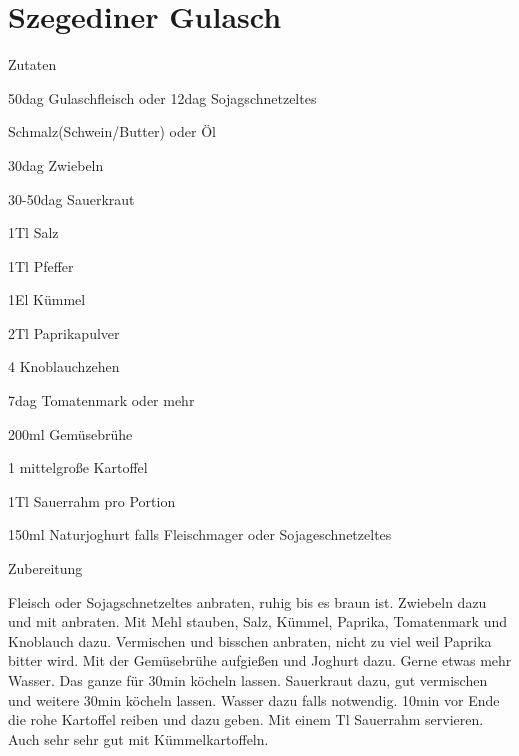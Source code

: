 \chapter*{Szegediner Gulasch}
\begin{multicols}{2}
 {\Large Zutaten}
 \begin{Zutaten}
		\item 50dag Gulaschfleisch
		oder 12dag Sojagschnetzeltes
		\item Schmalz(Schwein/Butter) oder Öl
		\item 30dag Zwiebeln
		\item 30-50dag Sauerkraut
		\item 1Tl Salz
		\item 1Tl Pfeffer
		\item 1El Kümmel
		\item 2Tl Paprikapulver
		\item 4 Knoblauchzehen
		\item 7dag Tomatenmark oder mehr
		\item 200ml Gemüsebrühe
		\item 1 mittelgroße Kartoffel
		\item 1Tl Sauerrahm pro Portion
		\item 150ml Naturjoghurt falls Fleischmager oder Sojageschnetzeltes
		
\end{Zutaten}
	
\columnbreak
{}
\end{multicols}

{\Large Zubereitung} \newline
\begin{addmargin}[1cm]{0cm}
	Fleisch oder Sojagschnetzeltes anbraten, ruhig bis es braun ist. \newline
	Zwiebeln dazu und mit anbraten. \newline
	Mit Mehl stauben, Salz, Kümmel, Paprika, Tomatenmark und Knoblauch dazu.
	Vermischen und bisschen anbraten, nicht zu viel weil Paprika bitter wird. \newline
	Mit der Gemüsebrühe aufgießen und Joghurt dazu. Gerne etwas mehr Wasser.
	Das ganze für 30min köcheln lassen. \newline
	Sauerkraut dazu, gut vermischen und weitere 30min köcheln lassen. Wasser dazu falls notwendig. \newline
	10min vor Ende die rohe Kartoffel reiben und dazu geben.
	Mit einem Tl Sauerrahm servieren. \newline
	Auch sehr sehr gut mit Kümmelkartoffeln.
	
	
\end{addmargin}
